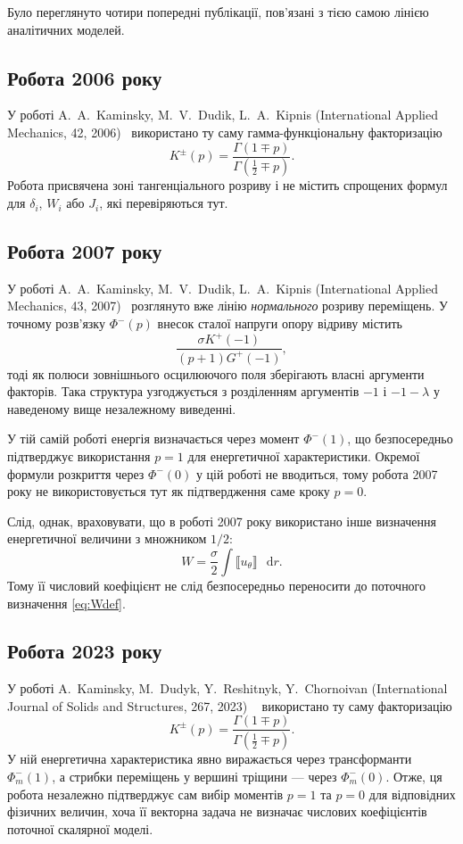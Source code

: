 \documentclass[12pt,a4paper]{article}
\newcommand{\dd}{\mathop{}\!\mathrm{d}}
\newcommand{\jump}[1]{\llbracket #1\rrbracket}
\begin{document}
Було переглянуто чотири попередні публікації, пов'язані з тією самою
лінією аналітичних моделей.

\subsection*{Робота 2006 року}

У роботі A.~A.~Kaminsky, M.~V.~Dudik, L.~A.~Kipnis
(International Applied Mechanics, 42, 2006)~\cite{Kaminsky2006}
використано ту саму гамма-функціональну факторизацію
\[
  K^\pm(p)=
  \frac{\Gamma(1\mp p)}
       {\Gamma(\tfrac12\mp p)}.
\]
Робота присвячена зоні тангенціального розриву і не містить
спрощених формул для $\delta_i$, $W_i$ або $J_i$, які перевіряються
тут.

\subsection*{Робота 2007 року}

У роботі A.~A.~Kaminsky, M.~V.~Dudik, L.~A.~Kipnis
(International Applied Mechanics, 43, 2007)~\cite{Kaminsky2007}
розглянуто вже лінію
\emph{нормального} розриву переміщень. У точному розв'язку
$\Phi^-(p)$ внесок сталої напруги опору відриву містить
\[
  \frac{\sigma K^+(-1)}
       {(p+1)G^+(-1)},
\]
тоді як полюси зовнішнього осцилюючого поля зберігають власні
аргументи факторів. Така структура узгоджується з розділенням
аргументів $-1$ і $-1-\lambda$ у наведеному вище незалежному
виведенні.

У тій самій роботі енергія визначається через момент
$\Phi^-(1)$, що безпосередньо підтверджує використання
$p=1$ для енергетичної характеристики. Окремої формули розкриття
через $\Phi^-(0)$ у цій роботі не вводиться, тому робота 2007 року
не використовується тут як підтвердження саме кроку $p=0$.

Слід, однак, враховувати, що в роботі 2007 року використано інше
визначення енергетичної величини з множником $1/2$:
\[
  W=\frac{\sigma}{2}\int \jump{u_\theta}\,\dd r.
\]
Тому її числовий коефіцієнт не слід безпосередньо переносити
до поточного визначення \eqref{eq:Wdef}.

\subsection*{Робота 2023 року}

У роботі A.~Kaminsky, M.~Dudyk, Y.~Reshitnyk, Y.~Chornoivan
(International Journal of Solids and Structures, 267, 2023)
~\cite{Kaminsky2023} використано ту саму факторизацію
\[
  K^\pm(p)=
  \frac{\Gamma(1\mp p)}
       {\Gamma(\tfrac12\mp p)}.
\]
У ній енергетична характеристика явно виражається через
трансформанти $\Phi_m^-(1)$, а стрибки переміщень у вершині
тріщини --- через $\Phi_m^-(0)$. Отже, ця робота незалежно
підтверджує сам вибір моментів $p=1$ та $p=0$ для відповідних
фізичних величин, хоча її векторна задача не визначає числових
коефіцієнтів поточної скалярної моделі.
\end{document}
